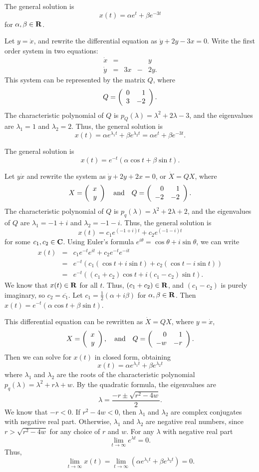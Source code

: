 \ans The general solution is
\[
x(t) = \alpha e^t + \beta e^{-3t}
\]
for $\alpha, \beta \in \mbox{$\bf{R}$}$.

\soln Let $y = \dot{x}$, and rewrite the differential equation as
$\dot{y} + 2y - 3x = 0$.  Write the first order system in two equations:
\[
\begin{array}{rrrrr}
\dot{x} & = & & & y \\
\dot{y} & = & 3x & - & 2y.
\end{array}
\]
This system can be represented by the matrix $Q$, where
\[
Q = \left(\begin{array}{rr} 0 & 1\\ 3 &-2\end{array}\right).
\]
The characteristic polynomial of $Q$ is $p_Q(\lambda) = \lambda^2
+ 2\lambda - 3$, and the eigenvalues are $\lambda_1 = 1$ and
$\lambda_2 = 2$.  Thus, the general solution is
\[
x(t) = \alpha e^{\lambda_1t} + \beta e^{\lambda_2t} =
\alpha e^t + \beta e^{-3t}.
\]

\ans The general solution is
\[
x(t) = e^{-t}(\alpha \cos{t} + \beta \sin{t}).
\]

\soln Let $y \dot{x}$ and rewrite the system as $\dot{y} + 2y + 2x = 0$,
or $\dot{X} = QX$, where
\[
X = \left(\begin{array}{r} x \\ y\end{array}\right) \quad\mbox{and}\quad Q = \left(\begin{array}{rr} 0 & 1\\ -2 &-2\end{array}\right).
\]
The characteristic polynomial of $Q$ is $p_q(\lambda) = \lambda^2 
+ 2\lambda + 2$, and the eigenvalues of $Q$ are $\lambda_1 = -1 + i$ and
$\lambda_2 = -1 - i$.  Thus, the general solution is
\[
x(t) = c_1e^{(-1 + i)t} + c_2e^{(-1 - i)t}
\]
for some $c_1, c_2 \in \mbox{$\bf{C}$}$.  Using Euler's formula $e^{i\theta} =
\cos\theta + i\sin\theta$, we can write
\[
\begin{array}{rcl}
x(t) & = & c_1e^{-t}e^{it} + c_2e^{-t}e^{-it} \\
& = & e^{-t}(c_1(\cos{t} + i\sin{t}) + c_2(\cos{t} - i\sin{t})) \\
& = & e^{-t}((c_1 + c_2)\cos{t} + i(c_1 - c_2)\sin{t}).
\end{array}
\]
We know that $x(t) \in \mbox{$\bf{R}$}$ for all $t$.  Thus, $(c_1 + c_2) \in \mbox{$\bf{R}$}$, and
$(c_1 - c_2)$ is purely imaginary, so $c_2 = \overline{c_1}$.  Let
$c_1 = \frac{1}{2}(\alpha + i\beta)$ for $\alpha, \beta \in \mbox{$\bf{R}$}$. 
Then $x(t) = e^{-t}(\alpha\cos{t} + \beta\sin{t})$.

This differential equation can be rewritten as $\dot{X} = QX$, where
$y = \dot{x}$,
\[
X = \left(\begin{array}{r} x \\ y\end{array}\right), \quad\mbox{and}\quad Q = \left(\begin{array}{rr} 0 & 1\\ -w &-r\end{array}\right).
\]
Then we can solve for $x(t)$ in closed form, obtaining
\[
x(t) = \alpha e^{\lambda_1 t} + \beta e^{\lambda_2 t}
\]
where $\lambda_1$ and $\lambda_2$ are the roots of the characteristic
polynomial $p_q(\lambda) = \lambda^2 + r\lambda + w$.  By the quadratic
formula, the eigenvalues are
\[
\lambda = \frac{-r \pm \sqrt{r^2 - 4w}}{2}.
\]
We know that $-r < 0$.  If $r^2 - 4w < 0$, then $\lambda_1$ and $\lambda_2$
are complex conjugates with negative real part.  Otherwise, $\lambda_1$
and $\lambda_2$ are negative real numbers, since $r > \sqrt{r^2 - 4w}$
for any choice of $r$ and $w$.  For any $\lambda$ with negative real part
\[
\lim_{t \rightarrow \infty} e^{\lambda t} = 0.
\]
Thus,
\[
\lim_{t \rightarrow \infty} x(t) =
\lim_{t \rightarrow \infty} (\alpha e^{\lambda_1 t} +
\beta e^{\lambda_2 t}) = 0.
\]

